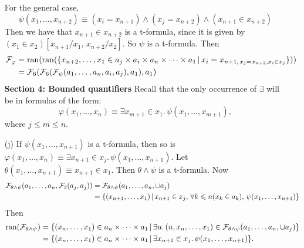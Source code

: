 \documentclass{article}
\begin{document}
\begin{enumerate}
          For the general case, \[\psi(x_{1},\dots, x_{n+2}) \equiv (x_{i} = x_{n+1}) \wedge (x_{j}=x_{n+2}) \wedge (x_{n+1} \in x_{n+2})\]
          Then we have that $x_{n+1} \in x_{n+2}$ is a t-formula, since it is given by $(x_{1} \in x_{2})[x_{n+1}/x_{1},\, x_{n+2}/x_{2}]$. So $\psi$ is a t-formula. Then \begin{align*} \calF_{\varphi} & = \ran(\ran(\{x_{n+2}, \dots, x_{1} \in a_{j} \times a_{i} \times a_{n} \times \dots \times a_{1} \, | \, x_{i} = x_{n+1, \, x_{j}=x_{n+2}, x_{i} \in x_{j}} \} )) \\
                               & = \calF_{6}(\calF_{6}(\calF_{\psi}(a_{1},\dots, a_{n},a_{i},a_{j}),a_{1}),a_{1})
          \end{align*}
          \textbf{Section 4: Bounded quantifiers}
          Recall that the only occurrence of $\exists$ will be in formulas of the form: \[ \varphi(x_{1},\dots,x_{n}) \equiv \exists x_{m+1}\in x_{1}. \, \psi(x_{1},\dots,x_{m+1}),\] where $j \leq m \leq n$.
    \item[(j)] If $\psi(x_{1},\dots,x_{n+1})$ is a t-formula, then so is $\varphi(x_{1},\dots,x_{n}) \equiv \exists x_{n+1} \in x_{j}.\, \psi(x_{1},\dots,x_{n+1})$. Let $\theta(x_{1},\dots,x_{n+1}) \equiv x_{n+1} \in x_{1}$. Then $\theta \wedge \psi$ is a t-formula. Now \begin{align*}
              \mathcal{F}_{\theta \wedge \psi}(a_{1},\dots,a_{n},\mathcal{F}_{2}(a_{j},a_{j})) & = \mathcal{F}_{\theta \wedge \psi}(a_{1},\dots,a_{n},\cup a_{j})                                                                    \\
                                                                                   & = \{(x_{n+1}, \dots, x_{1}) \, | \, x_{n+1} \in x_{j}, \, \forall k \leqslant n (x_{k} \in a_{k}), \, \psi(x_{1},\dots, x_{n+1})\}
          \end{align*}
          Then
          \begin{align*}
              \operatorname{ran}(\mathcal{F}_{\theta \wedge \psi}) & = \{ (x_{n},\dots,x_{1}) \in a_{n} \times \dots \times a_{1} \, | \, \exists u.\, (u,x_{n},\dots,x_{1}) \in \mathcal{F}_{\theta \wedge \psi}(a_{1},\dots,a_{n},\cup a_{j})\} \\
                                               & = \{ (x_{n},\dots,x_{1}) \in a_{n} \times \dots \times a_{1} \, | \, \exists x_{n+1} \in x_{j}. \, \psi(x_{1},\dots, x_{n+1})\}.
          \end{align*}
\end{enumerate}
\endproof
\end{document}
